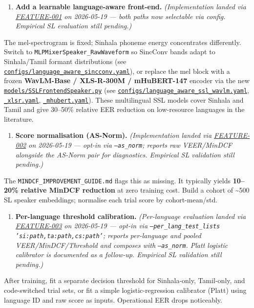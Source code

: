 \documentclass[10pt,a4paper]{article}
\begin{document}
\begin{enumerate}[leftmargin=*,itemsep=2pt]
  \item \textbf{Add a learnable language-aware front-end.} \textit{(Implementation landed via \href{docs/bugfixes/FEATURE-001-language-aware-frontend.md}{FEATURE-001} on 2026-05-19 --- both paths now selectable via config. Empirical SL evaluation still pending.)}
\end{enumerate}
The mel-spectrogram is fixed; Sinhala phoneme energy concentrates differently. Switch to \texttt{MLPMixerSpeaker\_RawWaveform} so SincConv bands adapt to Sinhala/Tamil formant distributions (see \href{configs/language_aware_sincconv.yaml}{\texttt{configs/language\_aware\_sincconv.yaml}}), or replace the mel block with a frozen \textbf{WavLM-Base / XLS-R-300M / mHuBERT-147} encoder via the new \href{models/SSLFrontendSpeaker.py}{\texttt{models/SSLFrontendSpeaker.py}} (see \href{configs/language_aware_ssl_wavlm.yaml}{\texttt{configs/language\_aware\_ssl\_wavlm.yaml}}, \href{configs/language_aware_ssl_xlsr.yaml}{\texttt{\_xlsr.yaml}}, \href{configs/language_aware_ssl_mhubert.yaml}{\texttt{\_mhubert.yaml}}). These multilingual SSL models cover Sinhala and Tamil and give 30--50\% relative EER reduction on low-resource languages in the literature.

\begin{enumerate}[leftmargin=*,itemsep=2pt]
  \item \textbf{Score normalisation (AS-Norm).} \textit{(Implementation landed via \href{docs/bugfixes/FEATURE-002-as-norm-score-normalisation.md}{FEATURE-002} on 2026-05-19 --- opt-in via \texttt{--as\_norm}; reports raw VEER/MinDCF alongside the AS-Norm pair for diagnostics. Empirical SL validation still pending.)}
\end{enumerate}
The \texttt{MINDCF\_IMPROVEMENT\_GUIDE.md} flags this as missing. It typically yields \textbf{10--20\% relative MinDCF reduction} at zero training cost. Build a cohort of \textasciitilde{}500 SL speaker embeddings; normalise each trial score by cohort-mean/std.

\begin{enumerate}[leftmargin=*,itemsep=2pt]
  \item \textbf{Per-language threshold calibration.} \textit{(Per-language evaluation landed via \href{docs/bugfixes/FEATURE-003-per-language-eval.md}{FEATURE-003} on 2026-05-19 --- opt-in via \texttt{--per\_lang\_test\_lists 'si:path,ta:path,cs:path'}; reports per-language and pooled VEER/MinDCF/Threshold and composes with \texttt{--as\_norm}. Platt logistic calibrator is documented as a follow-up. Empirical SL validation still pending.)}
\end{enumerate}
After training, fit a separate decision threshold for Sinhala-only, Tamil-only, and code-switched trial sets, or fit a simple logistic-regression calibrator (Platt) using language ID and raw score as inputs. Operational EER drops noticeably.
\end{document}
